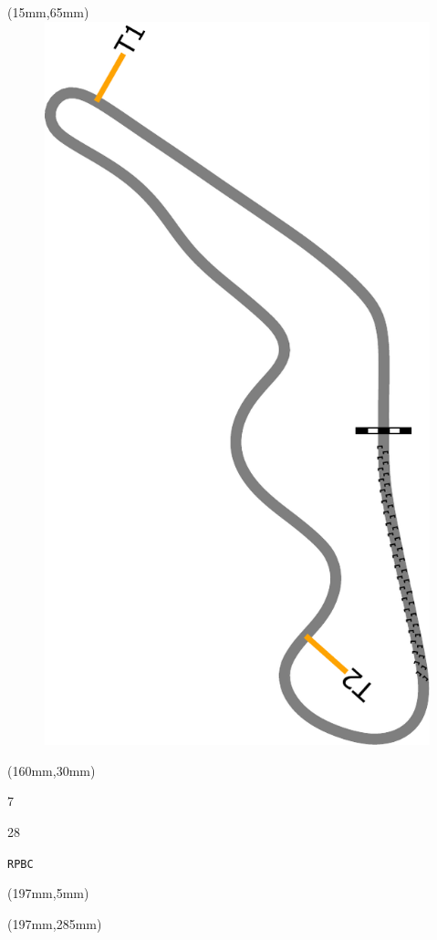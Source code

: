 \begin{textblock*}{185mm}(15mm,65mm)%
\centering
\mbox{\includegraphics[width=185mm,height=210mm,keepaspectratio]{PT/RPBC.pdf}}
\end{textblock*}
\begin{textblock*}{40mm}(160mm,30mm)%
\Large
\par{} 
\par7 
\par28 
\par\hfill\tiny\tt RPBC\\
\end{textblock*}
\begin{textblock*}{20mm}(197mm,5mm)%
\fbox{\thepage}
\label{RPBC}
\end{textblock*}
\begin{textblock*}{20mm}(197mm,285mm)%
\fbox{\thepage}
\end{textblock*}

